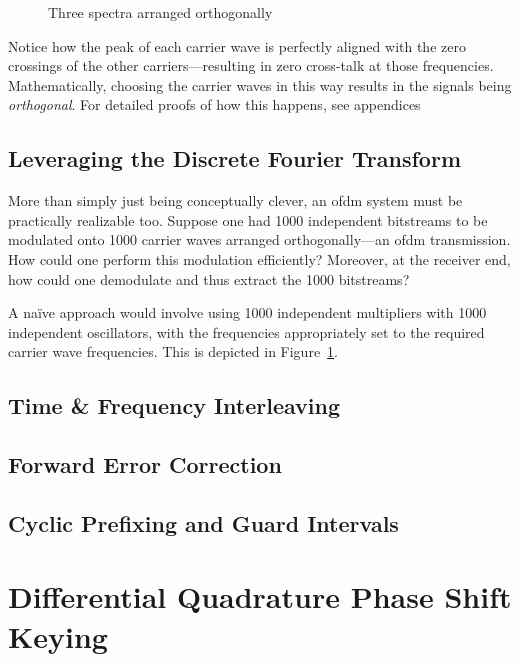 \documentclass[class=report,11pt,crop=false]{standalone}
\begin{document}
\begin{figure}[htbp]
    \centering
    \def\svgwidth{1\linewidth}
    { %
        }
    \caption{Three spectra arranged orthogonally}
    \label{fig:ofdm-three-sincs}
\end{figure}

Notice how the peak of each carrier wave is perfectly aligned with the zero crossings of the other carriers---resulting in zero cross-talk at those frequencies. Mathematically, choosing the carrier waves in this way results in the signals being \emph{orthogonal}. For detailed proofs of how this happens, see appendices%

\subsection{Leveraging the Discrete Fourier Transform}
More than simply just being conceptually clever, an \gls{ofdm} system must be practically realizable too. Suppose one had 1000 independent bitstreams to be modulated onto 1000 carrier waves arranged orthogonally---an \gls{ofdm} transmission. How could one perform this modulation efficiently? Moreover, at the receiver end, how could one demodulate and thus extract the 1000 bitstreams?

A na\"ive approach would involve using 1000 independent multipliers with 1000 independent oscillators, with the frequencies appropriately set to the required carrier wave frequencies. This is depicted in Figure~\ref{}.


\subsection{Time \& Frequency Interleaving}


\subsection{Forward Error Correction}

\subsection{Cyclic Prefixing and Guard Intervals}



\section{Differential Quadrature Phase Shift Keying \label{sect:dab-std_psk}}
\end{document}
